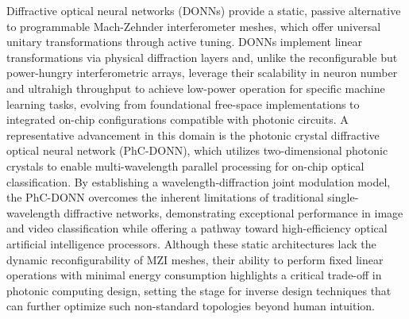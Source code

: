 \documentclass[11pt]{article}
\begin{document}
Diffractive optical neural networks (DONNs) provide a static, passive alternative to programmable Mach-Zehnder interferometer meshes, which offer universal unitary transformations through active tuning. DONNs implement linear transformations via physical diffraction layers and, unlike the reconfigurable but power-hungry interferometric arrays, leverage their scalability in neuron number and ultrahigh throughput to achieve low-power operation for specific machine learning tasks, evolving from foundational free-space implementations to integrated on-chip configurations compatible with photonic circuits. A representative advancement in this domain is the photonic crystal diffractive optical neural network (PhC-DONN), which utilizes two-dimensional photonic crystals to enable multi-wavelength parallel processing for on-chip optical classification. By establishing a wavelength-diffraction joint modulation model, the PhC-DONN overcomes the inherent limitations of traditional single-wavelength diffractive networks, demonstrating exceptional performance in image and video classification while offering a pathway toward high-efficiency optical artificial intelligence processors. Although these static architectures lack the dynamic reconfigurability of MZI meshes, their ability to perform fixed linear operations with minimal energy consumption highlights a critical trade-off in photonic computing design, setting the stage for inverse design techniques that can further optimize such non-standard topologies beyond human intuition. \citep{doi_10_1002_nap2_70098_8d5f2f8a} \citep{doi_10_1515_nanoph_2025_0168_86a0f7aa}
\end{document}
